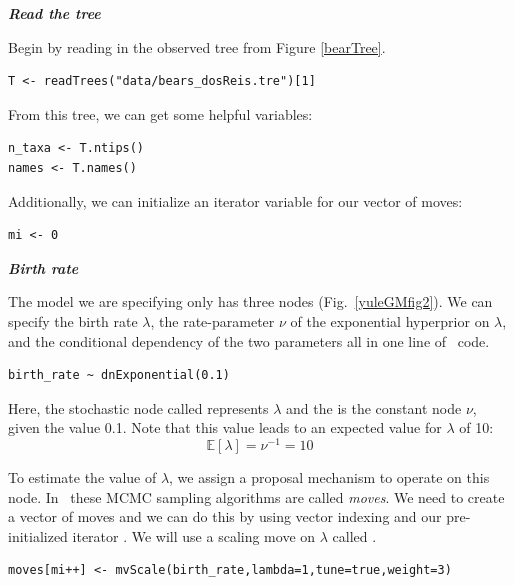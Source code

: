 \textbf{\textit{Read the tree}}

Begin by reading in the observed tree from Figure \ref{bearTree}. 

{\tt \begin{snugshade*}
\begin{lstlisting}
T <- readTrees("data/bears_dosReis.tre")[1]
\end{lstlisting}
\end{snugshade*}}

From this tree, we can get some helpful variables:
{\tt \begin{snugshade*}
\begin{lstlisting}
n_taxa <- T.ntips()
names <- T.names()
\end{lstlisting}
\end{snugshade*}}

Additionally, we can initialize an iterator variable for our vector of moves:
{\tt \begin{snugshade*}
\begin{lstlisting}
mi <- 0 
\end{lstlisting}
\end{snugshade*}}

\textbf{\textit{Birth rate}}

The model we are specifying only has three nodes (Fig.~\ref{yuleGMfig2}). 
We can specify the birth rate $\lambda$, the rate-parameter $\nu$ of the exponential hyperprior on $\lambda$, and the conditional dependency of the two parameters all in one line of \Rev~code.
{\tt \begin{snugshade*}
\begin{lstlisting}
birth_rate ~ dnExponential(0.1) 
\end{lstlisting}
\end{snugshade*}}
Here, the stochastic node called  represents $\lambda$ and the  is the constant node $\nu$, given the value 0.1. 
Note that this value leads to an expected value for $\lambda$ of 10:
$$\mathbb{E}[\lambda]=\nu^{-1} = 10$$

To estimate the value of $\lambda$, we assign a proposal mechanism to operate on this node. 
In \RevBayes~these MCMC sampling algorithms are called \textit{moves}. 
We need to create a vector of moves and we can do this by using vector indexing and our pre-initialized iterator .
We will use a scaling move on $\lambda$ called .
{\tt \begin{snugshade*}
\begin{lstlisting}
moves[mi++] <- mvScale(birth_rate,lambda=1,tune=true,weight=3)
\end{lstlisting}
\end{snugshade*}}


